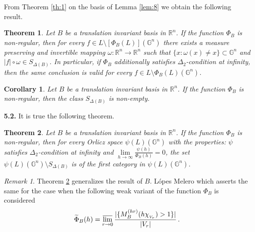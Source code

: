 \documentclass[12pt,reqno]{article}
\newtheorem{theorem}{Theorem}
\newtheorem{corollary}{Corollary}
\theoremstyle{remark}
\newtheorem{remark}{Remark}
\newcommand{\olim}{\operatornamewithlimits{\overline{lim}}}
\begin{document}
From Theorem \ref{th:1} on the basis of Lemma \ref{lem:8} we obtain the following result.

\begin{theorem}\label{th:2}
Let $B$ be a translation invariant basis in $\mathbb{R}^n$. If the function $\Phi_B$ is non-regular, then for every $f\in L\setminus[\Phi_B(L)](\mathbb{G}^n)$ there exists a measure preserving and invertible mapping $\omega:\mathbb{R}^n\to\mathbb{R}^n$ such that  $\{x:\omega(x)\neq x\}\subset \mathbb{G}^n$ and $|f|\circ\omega\in S_{\Delta(B)}$. In particular, if \;$\Phi_B$ additionally satisfies $\Delta_2$-condition at infinity, then the same conclusion is valid for every $f\in L\setminus \Phi_B(L)(\mathbb{G}^n)$.
\end{theorem}

\begin{corollary}\label{cor:1}
Let $B$ be a translation invariant basis in $\mathbb{R}^n$. If the function $\Phi_B$ is non-regular, then the class $S_{\Delta(B)}$ is non-empty.
\end{corollary}

\medskip
\medskip

\noindent \textbf{5.2.} It is true the following theorem.

\begin{theorem}\label{th:3}
Let $B$ be a translation invariant basis in $\mathbb{R}^n$. If the function $\Phi_B$ is non-regular, then for every Orlicz space $\psi(L)(\mathbb{G}^n)$ with the properties: $\psi$ satisfies $\Delta_2$-condition at infinity and $\lim\limits_{h\to\infty} \frac{\psi(h)}{\Phi_B(h)}=0$, the set $\psi(L)(\mathbb{G}^n)\setminus S_{\Delta(B)}$ is of the first category in $\psi(L)(\mathbb{G}^n)$.
\end{theorem}

\begin{remark}\label{rem:2}
Theorem \ref{th:3} generalizes the result of $B$. L\'{o}pes Melero \cite{9} which asserts the same for the case when the following weak variant of the function $\Phi_B$ is considered
$$  \widetilde{\Phi}_B(h)=\olim_{r\to 0} \frac{|\{M_B^{(hr)}(h\chi_{{}_{V_r}})>1\}|}{|V_r|}\,.      $$
\end{remark}
\end{document}
